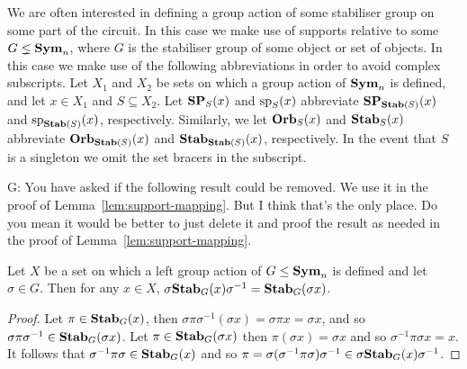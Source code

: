 \documentclass[../paper.tex]{subfiles}
\begin{document}
We are often interested in defining a group action of some stabiliser group on
some part of the circuit. In this case we make use of supports relative to some
$G \lneq \text{\textbf{Sym}}_n$, where $G$ is the stabiliser group of some object or set of
objects. In this case we make use of the following abbreviations in order to
avoid complex subscripts. Let $X_1$ and $X_2$ be sets on which a group action of
$\text{\textbf{Sym}}_n$ is defined, and let $x \in X_1$ and $S \subseteq X_2$. Let $\text{\textbf{SP}}_S(x)$
and $\text{sp}_S(x)$ abbreviate $\text{\textbf{SP}}_{\text{\textbf{Stab}}(S)}(x)$ and $\text{sp}_{\text{\textbf{Stab}}(S)}(x)$,
respectively. Similarly, we let $\text{\textbf{Orb}}_S(x)$ and $\text{\textbf{Stab}}_S(x)$ abbreviate
$\text{\textbf{Orb}}_{\text{\textbf{Stab}}(S)}(x)$ and $\text{\textbf{Stab}}_{\text{\textbf{Stab}}(S)}(x)$, respectively. In the event that
$S$ is a singleton we omit the set bracers in the subscript.


\begin{remark}
  G: You have asked if the following result could be removed. We use it in the
  proof of Lemma~\ref{lem:support-mapping}. But I think that's the only place.
  Do you mean it would be better to just delete it and proof the result as
  needed in the proof of Lemma~\ref{lem:support-mapping}.
\end{remark}

\begin{lem}
  \label{lem:stab-conjugation}
  Let $X$ be a set on which a left group action of $G \leq \text{\textbf{Sym}}_n$ is defined
  and let $\sigma \in G$. Then for any $x \in X$, $\sigma \text{\textbf{Stab}}_G (x)
  \sigma^{-1} = \text{\textbf{Stab}}_G(\sigma x)$.
\end{lem}

\begin{proof}
  Let $\pi \in \text{\textbf{Stab}}_G(x)$, then $\sigma \pi \sigma^{-1}(\sigma x) = \sigma \pi
  x = \sigma x$, and so $\sigma \pi \sigma^{-1} \in \text{\textbf{Stab}}_G(\sigma x)$. Let $\pi
  \in \text{\textbf{Stab}}_G(\sigma x)$ then $\pi (\sigma x) = \sigma x$ and so $\sigma^{-1}
  \pi \sigma x = x$. It follows that $\sigma^{-1} \pi \sigma \in \text{\textbf{Stab}}_G(x)$ and
  so $\pi = \sigma (\sigma^{-1} \pi \sigma) \sigma ^{-1} \in \sigma \text{\textbf{Stab}}_G(x)
  \sigma^{-1}$.
\end{proof}
\end{document}
